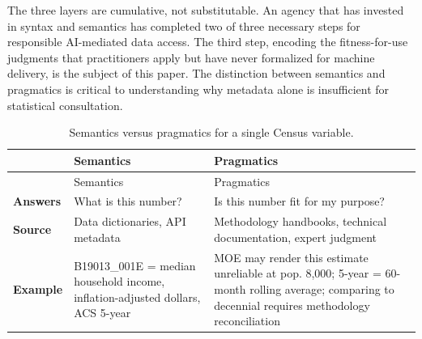 \documentclass[
  11pt,
  letterpaper,
]{article}
\begin{document}
The three layers are cumulative, not substitutable. An agency that has
invested in syntax and semantics has completed two of three necessary
steps for responsible AI-mediated data access. The third step, encoding
the fitness-for-use judgments that practitioners apply but have never
formalized for machine delivery, is the subject of this paper. The
distinction between semantics and pragmatics is critical to
understanding why metadata alone is insufficient for statistical
consultation.

\begin{longtable}[]{@{}
  >{\raggedright\arraybackslash}p{}
  >{\raggedright\arraybackslash}p{}
  >{\raggedright\arraybackslash}p{}@{}}
\caption{Semantics versus pragmatics for a single Census
variable.}\label{tbl-sem-vs-prag}\tabularnewline
\toprule\noalign{}
\begin{minipage}[b]{\linewidth}\raggedright
\end{minipage} & \begin{minipage}[b]{\linewidth}\raggedright
Semantics
\end{minipage} & \begin{minipage}[b]{\linewidth}\raggedright
Pragmatics
\end{minipage} \\
\midrule\noalign{}
\endfirsthead
\toprule\noalign{}
\begin{minipage}[b]{\linewidth}\raggedright
\end{minipage} & \begin{minipage}[b]{\linewidth}\raggedright
Semantics
\end{minipage} & \begin{minipage}[b]{\linewidth}\raggedright
Pragmatics
\end{minipage} \\
\midrule\noalign{}
\endhead
\bottomrule\noalign{}
\endlastfoot
\textbf{Answers} & What is this number? & Is this number fit for my
purpose? \\
\textbf{Source} & Data dictionaries, API metadata & Methodology
handbooks, technical documentation, expert judgment \\
\textbf{Example} & B19013\_001E = median household income,
inflation-adjusted dollars, ACS 5-year & MOE may render this estimate
unreliable at pop. 8,000; 5-year = 60-month rolling average; comparing
to decennial requires methodology reconciliation \\
\end{longtable}
\end{document}
